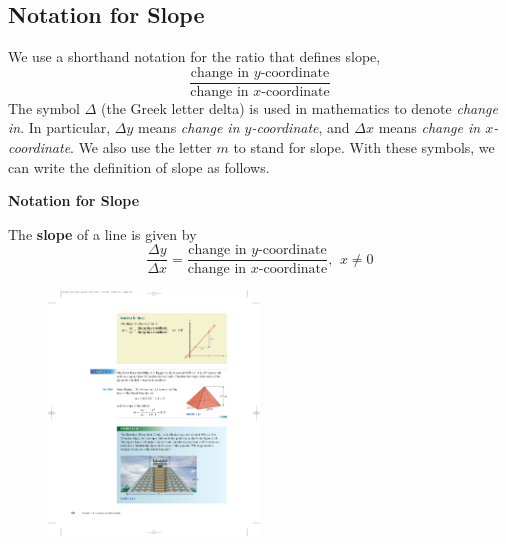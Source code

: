 \documentclass[10pt,]{book}
\newcommand{\terminology}[1]{\textbf{#1}}
\theoremstyle{plain}
\theoremstyle{definition}
\theoremstyle{definition}
\theoremstyle{definition}
\theoremstyle{definition}
\numberwithin{equation}{section}
\begin{document}
\subsection[Notation for Slope]{Notation for Slope}\label{subsection-20}

    We use a shorthand notation for the ratio that defines slope,
    \begin{equation*}\frac{\text{change in }y\text{-coordinate}}{\text{change in }x\text{-coordinate}}\end{equation*} 
    The symbol \(\Delta\) (the Greek letter delta) is used in mathematics to denote \emph{change in}. In particular, \(\Delta y\) means \emph{change in \(y\)-coordinate}, and \(\Delta x\) means \emph{change in \(x\)-coordinate}. We also use the letter \(m\) to stand for slope. With these symbols, we can write the definition of slope as follows.
%
\begin{mdframed}[style=assemblage]%
\noindent\textbf{\large Notation for Slope}\label{assemblage-10}\par\medskip

    The \terminology{slope} of a line is given by
    \begin{equation*}\frac{\Delta y}{\Delta x}=\frac{\text{change in }y\text{-coordinate}}{\text{change in }x\text{-coordinate}}\text{, }~x\ne 0\end{equation*} 

    \leavevmode%
\begin{figure}
\centering
\includegraphics[width=0.50\textwidth,]{images/fig-slope-Delta.pdf}\end{figure}
%
\end{mdframed}
\end{document}
